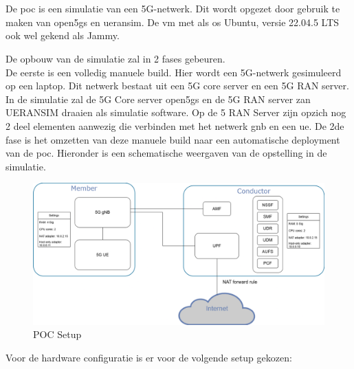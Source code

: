 \chapter{}%
\label{ch:poc}

\section{}%
\label{sec:sim}%
De \gls{poc} is een simulatie van een 5G-netwerk. Dit wordt opgezet door gebruik te maken van \gls{open5gs} en \gls{ueransim}. De \gls{vm} met als \gls{os} Ubuntu, versie 22.04.5 LTS ook wel gekend als Jammy. 

De opbouw van de simulatie zal in 2 fases gebeuren. \\De eerste is een volledig manuele build. Hier wordt een 5G-netwerk gesimuleerd op een laptop. Dit netwerk bestaat uit een 5G core server en een 5G RAN server. In de simulatie zal de 5G Core server \gls{open5gs} en de 5G RAN server zan UERANSIM draaien als simulatie software. Op de 5 RAN Server zijn opzich nog 2 deel elementen aanwezig die verbinden met het netwerk \gls{gnb} en een \gls{ue}. De 2de fase is het omzetten van deze manuele build naar een automatische deployment van de \gls{poc}. Hieronder is een schematische weergaven van de opstelling in de simulatie. 

\begin{figure}[H]
    \includegraphics[width=\linewidth]{../graphics/POC-setup.png}
    \caption{POC Setup}
    \label{fig:poc-setup}
\end{figure}

Voor de hardware configuratie is er voor de volgende setup gekozen:

